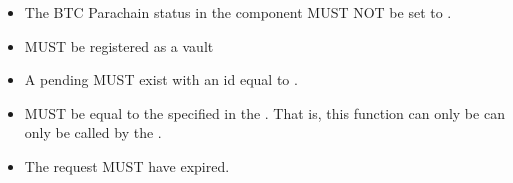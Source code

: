 \documentclass[a4paper,10pt,english]{sphinxmanual}
\begin{document}
\begin{itemize}
\item {} 
The BTC Parachain status in the {\hyperref[\detokenize{spec/security:security}]{}} component MUST NOT be set to .

\item {} 
 MUST be registered as a vault

\item {} 
A pending  MUST exist with an id equal to .

\item {} 
 MUST be equal to the  specified in the . That is, this function can only be can only be called by the .

\item {} 
The request MUST have expired.

\end{itemize}
\end{document}
